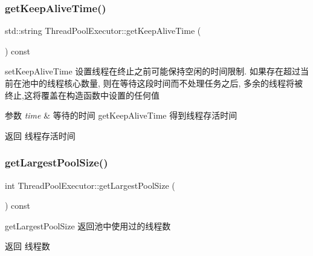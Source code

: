 \subsubsection{\texorpdfstring{get\+Keep\+Alive\+Time()}{getKeepAliveTime()}}
{\footnotesize\ttfamily std\+::string Thread\+Pool\+Executor\+::get\+Keep\+Alive\+Time (\begin{DoxyParamCaption}{ }\end{DoxyParamCaption}) const}



set\+Keep\+Alive\+Time 设置线程在终止之前可能保持空闲的时间限制. 如果存在超过当前在池中的线程核心数量, 则在等待这段时间而不处理任务之后, 多余的线程将被终止,这将覆盖在构造函数中设置的任何值 


\begin{DoxyParams}{参数}
{\em time} & 等待的时间 get\+Keep\+Alive\+Time 得到线程存活时间\\
\hline
\end{DoxyParams}
\begin{DoxyReturn}{返回}
线程存活时间 
\end{DoxyReturn}
\mbox{\label{classThreadPoolExecutor_a884aecf32f12775eb713aacef9ddded0}} 
\subsubsection{\texorpdfstring{get\+Largest\+Pool\+Size()}{getLargestPoolSize()}}
{\footnotesize\ttfamily int Thread\+Pool\+Executor\+::get\+Largest\+Pool\+Size (\begin{DoxyParamCaption}{ }\end{DoxyParamCaption}) const}



get\+Largest\+Pool\+Size 返回池中使用过的线程数 

\begin{DoxyReturn}{返回}
线程数 
\end{DoxyReturn}
\mbox{\label{classThreadPoolExecutor_a50b63440d1d93f3c5c19082ca538edb6}} 
